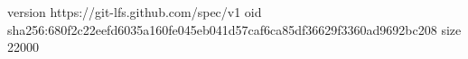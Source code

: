 version https://git-lfs.github.com/spec/v1
oid sha256:680f2c22eefd6035a160fe045eb041d57caf6ca85df36629f3360ad9692bc208
size 22000
